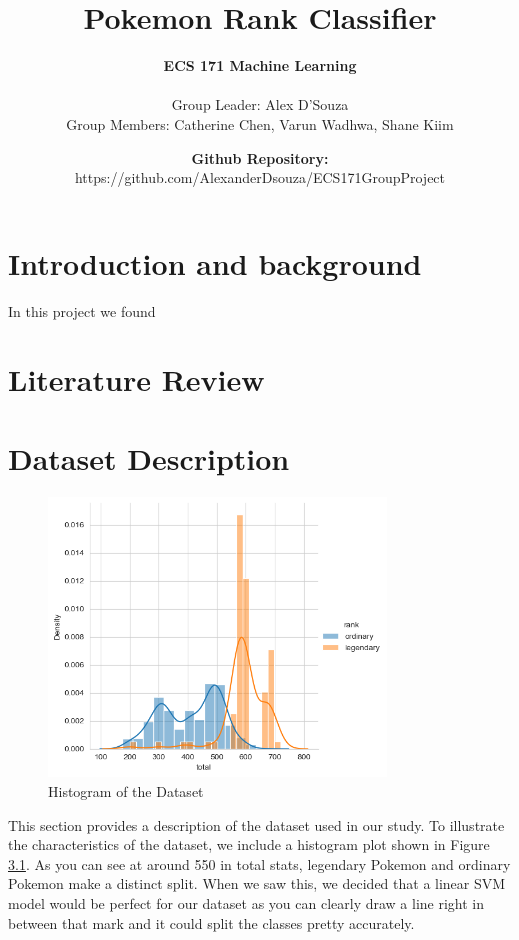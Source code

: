\documentclass[11pt, letterpaper]{report}
\title{\textbf{Pokemon Rank Classifier}}
\author{\textbf{ECS 171 Machine Learning} \\\\Group Leader: Alex D'Souza \\ Group Members: Catherine Chen, Varun Wadhwa, Shane Kiim}
\date{\textbf{Github Repository: }https://github.com/AlexanderDsouza/ECS171GroupProject}
\begin{document}
    \maketitle
    \chapter{Introduction and background}
    In this project we found 

    \chapter{Literature Review}
    
    \chapter{Dataset Description}
  
    \begin{figure}[H]
        \centering
        \includegraphics[width=0.8\textwidth]{histplot.png} %
        \caption{Histogram of the Dataset}
        \label{fig:dataset-hist}
    \end{figure}
  This section provides a description of the dataset used in our study. To illustrate the characteristics of the dataset, we include a histogram plot shown in Figure \ref{fig:dataset-hist}. As you can see at around 550 in total stats, legendary Pokemon and ordinary Pokemon make a distinct split. When we saw this, we decided that a linear SVM model would be perfect for our dataset as you can clearly draw a line right in between that mark and it could split the classes pretty accurately. 
\end{document}
